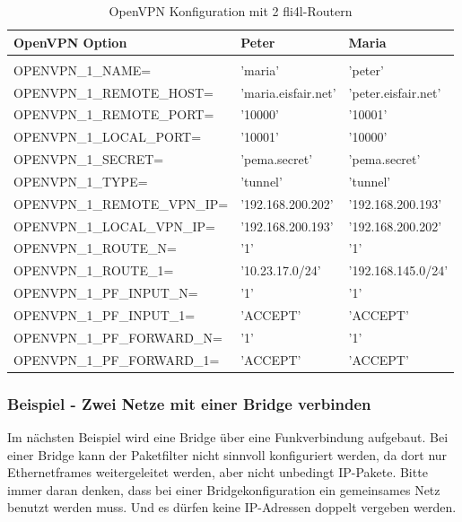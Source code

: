 \begin{table}[htbp]
  \begin{scriptsize}
    \begin{tabular}{lll}
      OpenVPN Option                & Peter              & Maria               \\
      \hline \\
      OPENVPN\_1\_NAME=             & 'maria'            & 'peter'             \\
      OPENVPN\_1\_REMOTE\_HOST=     & 'maria.eisfair.net' & 'peter.eisfair.net' \\
      OPENVPN\_1\_REMOTE\_PORT=     & '10000'            & '10001'             \\
      OPENVPN\_1\_LOCAL\_PORT=      & '10001'            & '10000'             \\
      OPENVPN\_1\_SECRET=           & 'pema.secret'      & 'pema.secret'       \\
      OPENVPN\_1\_TYPE=             & 'tunnel'           & 'tunnel'            \\
      OPENVPN\_1\_REMOTE\_VPN\_IP=  & '192.168.200.202'  & '192.168.200.193'   \\
      OPENVPN\_1\_LOCAL\_VPN\_IP=   & '192.168.200.193'  & '192.168.200.202'   \\
      OPENVPN\_1\_ROUTE\_N=         & '1'                & '1'                 \\
      OPENVPN\_1\_ROUTE\_1=         & '10.23.17.0/24'    & '192.168.145.0/24'  \\
      OPENVPN\_1\_PF\_INPUT\_N=   & '1'                & '1'                 \\
      OPENVPN\_1\_PF\_INPUT\_1=   & 'ACCEPT'           & 'ACCEPT'            \\
      OPENVPN\_1\_PF\_FORWARD\_N= & '1'                & '1'                 \\
      OPENVPN\_1\_PF\_FORWARD\_1= & 'ACCEPT'  & 'ACCEPT' \\
    \end{tabular}
  \end{scriptsize}
  \caption{OpenVPN Konfiguration mit 2 fli4l-Routern}
\end{table}

\subsubsection{Beispiel - Zwei Netze mit einer Bridge verbinden}

Im nächsten Beispiel wird eine Bridge über eine Funkverbindung
aufgebaut. Bei einer Bridge kann der Paketfilter nicht sinnvoll
konfiguriert werden, da dort nur Ethernetframes weitergeleitet werden,
aber nicht unbedingt IP-Pakete. Bitte immer daran denken, dass bei
einer Bridgekonfiguration ein gemeinsames Netz benutzt werden
muss. Und es dürfen keine IP-Adressen doppelt vergeben werden.

